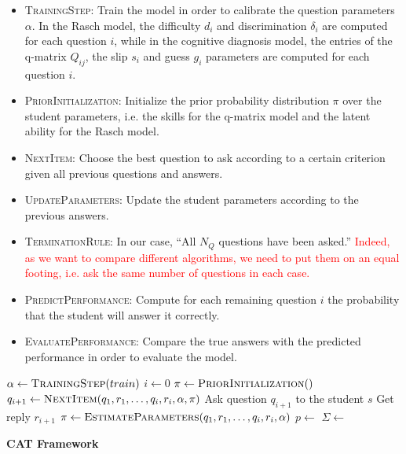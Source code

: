 \documentclass{sig-alternate}
\newcommand\alert[1]{\textcolor{red}{#1}}
\begin{document}
\begin{itemize}
\item \textsc{TrainingStep}: Train the model in order to calibrate the question parameters $\alpha$. In the Rasch model, the difficulty $d_i$ and discrimination $\delta_i$ are computed for each question $i$, while in the cognitive diagnosis model, the entries of the q-matrix $Q_{ij}$, the slip $s_i$ and guess $g_i$ parameters are computed for each question $i$.
\item \textsc{PriorInitialization}: Initialize the prior probability distribution $\pi$ over the student parameters, i.e. the skills for the q-matrix model and the latent ability for the Rasch model. 
\item \textsc{NextItem}: Choose the best question to ask according to a certain criterion given all previous questions and answers. 
\item \textsc{UpdateParameters}: Update the student parameters according to the previous answers.
\item \textsc{TerminationRule}: In our case, ``All $N_Q$ questions have been asked.'' \alert{Indeed, as we want to compare different algorithms, we need to put them on an equal footing, i.e. ask the same number of questions in each case.}
\item \textsc{PredictPerformance}: Compute for each remaining question $i$ the probability that the student will answer it correctly.
\item \textsc{EvaluatePerformance}: Compare the true answers with the predicted performance in order to evaluate the model. 
\end{itemize}

\begin{algorithm}
\begin{algorithmic}
\State $\alpha \gets \Call{TrainingStep}{train}$
\State $i \gets 0$
	\State $\pi \gets \Call{PriorInitialization}$
		\State $q_{i + 1} \gets \Call{NextItem}{q_1, r_1, \ldots, q_i, r_i, \alpha, \pi}$
		\State Ask question $q_{i + 1}$ to the student $s$
		\State Get reply $r_{i + 1}$
		\State $\pi \gets \Call{EstimateParameters}{q_1, r_1, \ldots, q_i, r_i, \alpha}$
		\State $p \gets$ 
		\State $\Sigma \gets$ 
	\EndWhile
\EndFor
\EndProcedure
\end{algorithmic}
\caption{\textbf{CAT Framework}}
\label{algo}
\end{algorithm}
\end{document}
